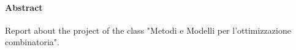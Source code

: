 \paragraph{Abstract} Report about the project of the class "Metodi e Modelli per l'ottimizzazione combinatoria". 